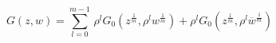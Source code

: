 \begin{equation}
G(z,w)=\sum _{l=0}^{m-1}\, \rho ^{l}G_{0}(z^{\frac{1}{m}},\rho
^{l}w^{\frac{1}{m}})+\rho ^{l}G_{0}(z^{\frac{1}{m}},\rho
^{l}\overline{w}^{\frac{1}{m}})
\end{equation}

